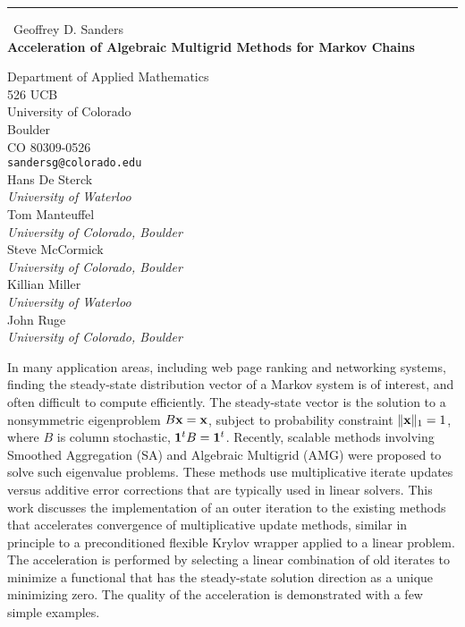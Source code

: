 \documentclass{report}
\begin{document}
\begin{center}
\rule{6in}{1pt} \
{\large Geoffrey D. Sanders \\
{\bf Acceleration of Algebraic Multigrid Methods for Markov Chains}}

Department of Applied Mathematics \\ 526 UCB \\ University of Colorado \\ Boulder \\ CO 80309-0526
\\
{\tt sandersg@colorado.edu}\\
Hans De Sterck\\
{\em University of Waterloo}\\
Tom Manteuffel\\
{\em University of Colorado, Boulder}\\
Steve McCormick\\
{\em University of Colorado, Boulder}\\
Killian Miller\\
{\em University of Waterloo}\\
John Ruge\\
{\em University of Colorado, Boulder}\end{center}

In many application areas, including web page ranking and networking
systems, finding the steady-state distribution vector of a Markov system
is of interest, and often difficult to compute efficiently. The
steady-state vector is the solution to a nonsymmetric eigenproblem $B
{\bf x} = {\bf x}$, subject to probability constraint $\|{\bf x}\|_1 =
1$, where $B$ is column stochastic, ${\bf 1}^t B = {\bf 1}^t$. Recently,
scalable methods involving Smoothed Aggregation (SA) and Algebraic
Multigrid (AMG) were proposed to solve such eigenvalue problems. These
methods
use multiplicative iterate updates versus additive error corrections that
are typically used in linear solvers. This work discusses the
implementation of an outer iteration to the existing methods that
accelerates convergence of multiplicative update methods, similar in
principle to a preconditioned flexible Krylov wrapper applied to a linear
problem. The acceleration is performed by selecting a linear combination
of old iterates to minimize a functional that has the steady-state
solution direction as a unique minimizing zero. The quality of the
acceleration is demonstrated with a few simple examples.
\end{document}
